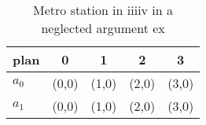 \documentclass[a4paper]{article}
\begin{document}
\begin{table}
\begin{adjustbox}{width=0.7\columnwidth}
\begin{tabular}{|l|l|l|l|l|}
\hline
\textbf{plan} & \multicolumn{1}{c|}{\textbf{0}} & \multicolumn{1}{c|}{\textbf{1}} & \multicolumn{1}{c|}{\textbf{2}} & \multicolumn{1}{c|}{\textbf{3}} \\ \hline
\textbf{$a_0$}  & (0,0) & (1,0) & (2,0) & (3,0) \\ \hline
\textbf{$a_1$}  & (0,0) & (1,0) & (2,0) & (3,0) \\ \hline
\end{tabular}
\end{adjustbox}
\caption{Metro station in iiiiv in a neglected argument ex
}
\end{table}
\end{document}
